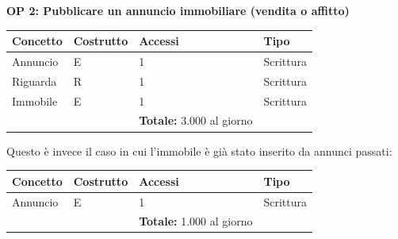 \documentclass[a4paper,12pt]{report}
\begin{document}
            \textbf{OP 2: Pubblicare un annuncio immobiliare (vendita o affitto)}
        	\begin{table}[H]
            \centering
             \begin{tabular}{llll}
             \rowcolor{yellow!20} \textbf{Concetto} & \textbf{Costrutto} & \textbf{Accessi} & \textbf{Tipo} \\ [0.5ex] 
             \hline
             Annuncio & E & 1 & Scrittura \\ 
             Riguarda & R & 1 & Scrittura \\ 
             Immobile & E & 1 & Scrittura \\ 
             \hline
             \rowcolor{yellow!20}  \rowcolor{yellow!20} &   & \textbf{Totale:}  3.000 al giorno &  \\ [1ex] 
             \end{tabular}
            \end{table}

            Questo è invece il caso in cui l'immobile è già stato inserito da annunci passati:
            
        	\begin{table}[H]
            \centering
             \begin{tabular}{llll}
             \rowcolor{yellow!20}\rowcolor{yellow!20} \textbf{Concetto} & \textbf{Costrutto} & \textbf{Accessi} & \textbf{Tipo}\\ [0.5ex] 
             \hline
             Annuncio & E & 1 & Scrittura \\ 
             \hline
             \rowcolor{yellow!20} &   & \textbf{Totale:}  1.000 al giorno &  \\ [1ex] 
             \end{tabular}
            \end{table}
\end{document}
